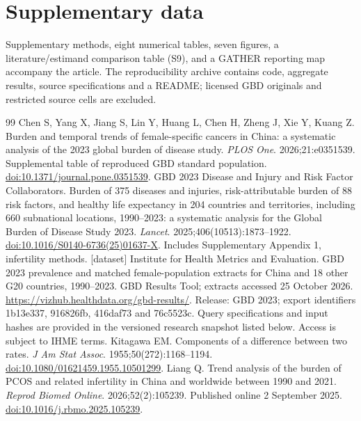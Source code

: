 \documentclass[11pt,a4paper]{article}
\begin{document}
\section*{Supplementary data}
Supplementary methods, eight numerical tables, seven figures, a literature/estimand comparison table (S9), and a GATHER reporting map accompany the article. The reproducibility archive contains code, aggregate results, source specifications and a README; licensed GBD originals and restricted source cells are excluded.

{\small{}
\begin{thebibliography}{99}
Chen S, Yang X, Jiang S, Lin Y, Huang L, Chen H, Zheng J, Xie Y, Kuang Z. Burden and temporal trends of female-specific cancers in China: a systematic analysis of the 2023 global burden of disease study. \emph{PLOS One}. 2026;21:e0351539. Supplemental table of reproduced GBD standard population. \href{https://doi.org/10.1371/journal.pone.0351539}{doi:10.1371/journal.pone.0351539}.
GBD 2023 Disease and Injury and Risk Factor Collaborators. Burden of 375 diseases and injuries, risk-attributable burden of 88 risk factors, and healthy life expectancy in 204 countries and territories, including 660 subnational locations, 1990--2023: a systematic analysis for the Global Burden of Disease Study 2023. \emph{Lancet}. 2025;406(10513):1873--1922. \href{https://doi.org/10.1016/S0140-6736(25)01637-X}{doi:10.1016/S0140-6736(25)01637-X}. Includes Supplementary Appendix 1, infertility methods.
[dataset] Institute for Health Metrics and Evaluation. GBD 2023 prevalence and matched female-population extracts for China and 18 other G20 countries, 1990--2023. GBD Results Tool; extracts accessed 25 October 2026. \url{https://vizhub.healthdata.org/gbd-results/}. Release: GBD 2023; export identifiers 1b13e337, 916826fb, 416daf73 and 76c5523c. Query specifications and input hashes are provided in the versioned research snapshot listed below. Access is subject to IHME terms.
Kitagawa EM. Components of a difference between two rates. \emph{J Am Stat Assoc}. 1955;50(272):1168--1194. \href{https://doi.org/10.1080/01621459.1955.10501299}{doi:10.1080/01621459.1955.10501299}.
Liang Q. Trend analysis of the burden of PCOS and related infertility in China and worldwide between 1990 and 2021. \emph{Reprod Biomed Online}. 2026;52(2):105239. Published online 2 September 2025. \href{https://doi.org/10.1016/j.rbmo.2025.105239}{doi:10.1016/j.rbmo.2025.105239}.

\end{thebibliography}}
\end{document}
